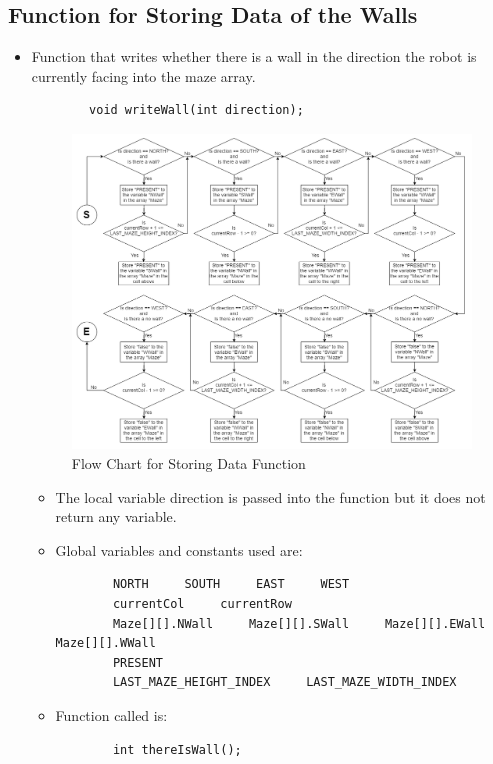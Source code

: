 \documentclass[11pt]{article}
\begin{document}
\subsection{Function for Storing Data of the Walls}
\begin{itemize}
\item Function that writes whether there is a wall in the direction the robot is currently facing into the maze array.
	\begin{verbatim}
		void writeWall(int direction);
	\end{verbatim}
\begin{figure}[htp]
\centering
\includegraphics[scale=0.44]{images/Software_Flowchart/writeWall.png}
\caption{Flow Chart for Storing Data Function}
\label{}
\end{figure}
	\begin{itemize}
	\item The local variable direction is passed into the function but it does not return any variable.
	\item Global variables and constants used are:
	\begin{verbatim}
		NORTH     SOUTH     EAST     WEST
		currentCol     currentRow
		Maze[][].NWall     Maze[][].SWall     Maze[][].EWall     Maze[][].WWall
		PRESENT
		LAST_MAZE_HEIGHT_INDEX     LAST_MAZE_WIDTH_INDEX
	\end{verbatim}
	\item Function called is:
	\begin{verbatim}
		int thereIsWall();
	\end{verbatim}
	\end{itemize}
\end{itemize}
\newpage
\end{document}
